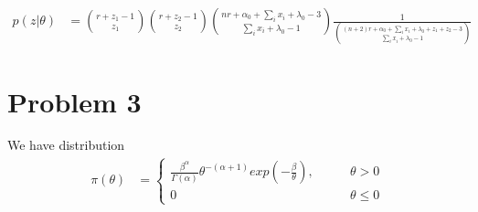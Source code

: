 \begin{itemize}
\begin{align*}
	p(z | \theta) & =  {r+z_1-1 \choose z_1} {r+z_2-1 \choose z_2} {nr+\alpha_0+ \sum_i x_i + \lambda_0-3 \choose \sum_i x_i + \lambda_0-1} \frac{1}{{(n+2) r + \alpha_0 + \sum_i x_i + \lambda_0 + z_1+z_2 -3 \choose \sum_i x_i + \lambda_0-1}}
\end{align*}

\end{itemize}

\section{Problem 3}
We have distribution 
\begin{align}
	\pi(\theta) &= \begin{cases} 
		\frac{\beta^{\alpha} }{\Gamma(\alpha)} \theta^{-(\alpha + 1)} exp(-\frac{\beta}{\theta}), & \qquad \theta > 0 \\
		0 & \qquad \theta \leq 0
		\end{cases} 
	\label{eq:1}
\end{align}

